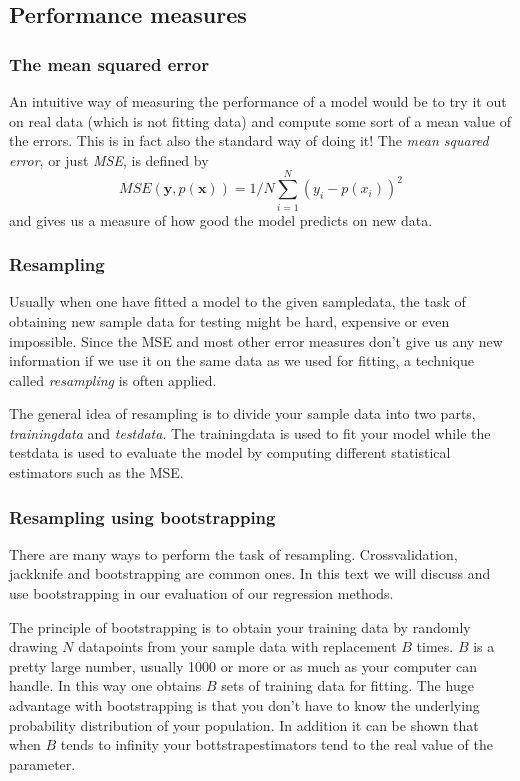 \documentclass[a4paper,norsk]{article}
\begin{document}
\subsection{Performance measures}
\subsubsection{The mean squared error}
An intuitive way of measuring the performance of a model would be to try
it out on real data (which is not fitting data) and compute some sort of 
a mean value of the errors. This is in fact also the standard way of doing
it! The \textit{mean squared error}, or just 
\textit{MSE}, is defined by 
\begin{equation}
    MSE(\bm{y},p(\bm{x})) = 1/N \sum_{i=1}^N (y_i - p(x_i))^2
\end{equation}
and gives us a measure of how good the model predicts on new data.
\subsubsection{Resampling}
Usually when one have fitted a model to the given sampledata, the task
of obtaining new sample data for testing might
be hard, expensive or even impossible. Since the MSE and most other 
error measures don't give us any 
new information if we use it on the same data as we used for fitting, 
a technique called \textit{resampling} is often applied. 
\par
The general idea of resampling is to divide
your sample data into two parts, \textit{trainingdata} and 
\textit{testdata}. The trainingdata is used to fit your 
model while the testdata is used to evaluate the model by computing 
different statistical estimators such as the MSE.

\subsubsection{Resampling using bootstrapping}
There are many ways to perform the task of resampling.
Crossvalidation, jackknife and bootstrapping are common ones. In this
text we will discuss and use bootstrapping in our evaluation of our 
regression methods. 
\par
The principle of bootstrapping is to obtain your training data by 
randomly drawing $N$ datapoints 
from your sample data with replacement $B$ times. $B$ is a pretty large
number, usually 1000 or more or as much as your computer can handle. 
In this way one obtains $B$ sets of training data for fitting. 
The huge advantage with bootstrapping is that you don't have to know 
the underlying probability
distribution of your population. In addition it can be shown that when
$B$ tends to infinity your bottstrapestimators tend to the real value of
the parameter.
\end{document}

